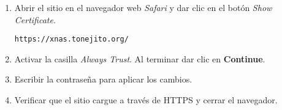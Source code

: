 {
\linespread{0.1}
\begin{enumerate}

  \item Abrir el sitio en el navegador web \textsl{Safari} y dar clic en el bot\'{o}n \textsl{Show Certificate}.

    \texttt{https://xnas.tonejito.org/}


\newpage
  \item Activar la casilla \textsl{Always Trust}. Al terminar dar clic en \textbf{Continue}.


  \item Escribir la contrase\~{n}a para aplicar los cambios.


  \item Verificar que el sitio cargue a trav\'{e}s de \textsc{HTTPS} y cerrar el navegador.


\end{enumerate}
}

